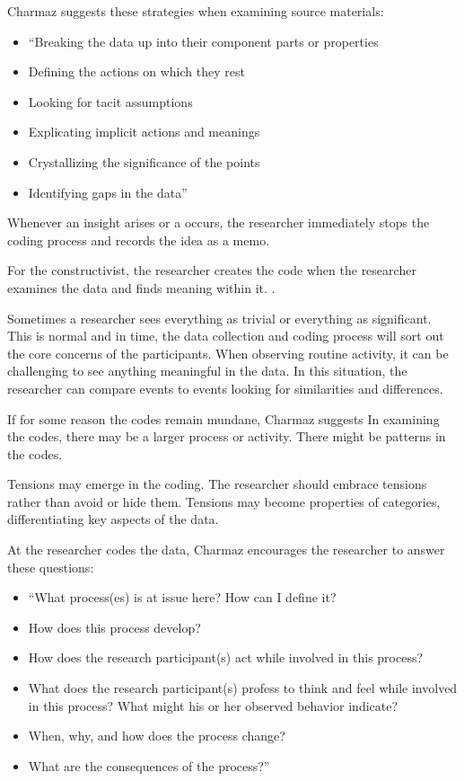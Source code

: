 Charmaz suggests these strategies when examining source materials:
\begin{itemize}
\item ``Breaking the data up into their component parts or properties
\item Defining the actions on which they rest
\item Looking for tacit assumptions
\item Explicating implicit actions and meanings
\item Crystallizing the significance of the points
\item Identifying gaps in the data'' \cite{Charmaz}
\end{itemize}

Whenever an insight arises or a  occurs, the researcher immediately stops the coding process and records the idea as a memo.

For the constructivist, the researcher creates the code when the researcher examines the data and finds meaning within it.  \cite{Charmaz}.

Sometimes a researcher sees everything as trivial or everything as significant. This is normal and in time, the data collection and coding process will sort out the core concerns of the participants. When observing routine activity, it can be challenging to see anything meaningful in the data. In this situation, the researcher can compare events to events looking for similarities and differences. 

If for some reason the codes remain mundane, Charmaz suggests  In examining the codes, there may be a larger process or activity. There might be patterns in the codes. 

Tensions may emerge in the coding. The researcher should embrace tensions rather than avoid or hide them. Tensions may become properties of categories, differentiating key aspects of the data.

At the researcher codes the data, Charmaz encourages the researcher to answer these questions:
\begin{itemize}
\item ``What process(es) is at issue here? How can I define it?
\item How does this process develop?
\item How does the research participant(s) act while involved in this process?
\item What does the research participant(s) profess to think and feel while involved in this process? What might his or her observed behavior indicate?
\item When, why, and how does the process change?
\item What are the consequences of the process?'' \cite{Charmaz}
\end{itemize}

